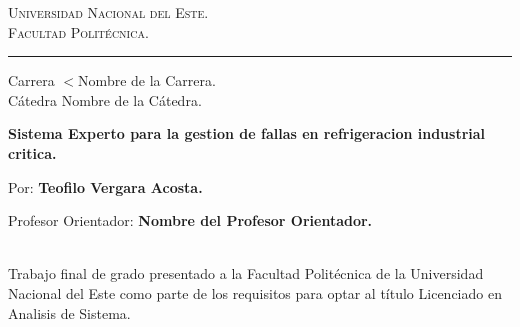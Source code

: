 \vspace*{-3cm}
\begin{figure}[h]
\leavevmode
\begin{minipage}{\textwidth}
\begin{center}
\end{center}
\end{minipage}
\end{figure}

\thispagestyle{empty}

{\bf
\begin{center}
\large
\vspace*{-1 cm}\Large \textsc{Universidad Nacional del Este.} \\
\Large \textsc{Facultad Politécnica.} \\
\vspace*{0.5 cm}\hrule
\vspace*{0.5 cm}\Large Carrera $<$Nombre de la Carrera.\\
\vspace*{0 cm}\Large Cátedra Nombre de la Cátedra.\\
\end{center}
}

\vspace{3.5 cm}
{
\noindent
\begin{center}
\huge \bf Sistema Experto para la gestion de fallas en refrigeracion industrial critica.
\end{center}
}


\vspace{0.5 cm}
{ 

Por: \textbf{\Large Teofilo Vergara Acosta.}

\vspace*{.5 cm}
Profesor Orientador: \textbf{\large Nombre del Profesor Orientador.}
}%
\vspace*{0.5 cm}\\
Trabajo final de grado presentado a la Facultad Politécnica de la Universidad Nacional del Este como parte de los requisitos para optar al título Licenciado en Analisis de Sistema.

